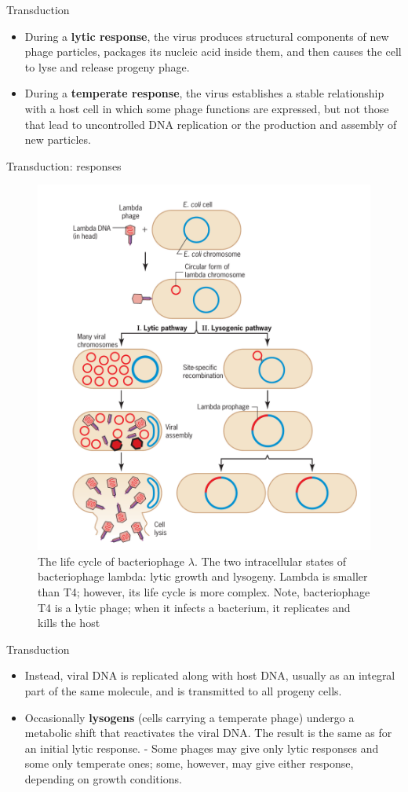 \documentclass[ignorenonframetext,aspectratio=169]{beamer}
\providecommand{\tightlist}{%
  \setlength{\itemsep}{0pt}\setlength{\parskip}{0pt}}
\begin{document}
\begin{frame}{Transduction}
\protect\hypertarget{transduction-1}{}

\begin{itemize}
\tightlist
\item
  During a \textbf{lytic response}, the virus produces structural
  components of new phage particles, packages its nucleic acid inside
  them, and then causes the cell to lyse and release progeny phage.
\item
  During a \textbf{temperate response}, the virus establishes a stable
  relationship with a host cell in which some phage functions are
  expressed, but not those that lead to uncontrolled DNA replication or
  the production and assembly of new particles.
\end{itemize}

\end{frame}

\begin{frame}{Transduction: responses}
\protect\hypertarget{transduction-responses}{}

\begin{figure}
\includegraphics[width=0.25\linewidth]{./../images/bacteriophage_stages} \caption{The life cycle of bacteriophage $\lambda$. The two intracellular states of bacteriophage lambda: lytic growth and lysogeny. Lambda is smaller than T4; however, its life cycle is more complex. Note, bacteriophage T4 is a lytic phage; when it infects a bacterium, it replicates and kills the host}\label{fig:transduction-bacteriophage}
\end{figure}

\end{frame}

\begin{frame}{Transduction}
\protect\hypertarget{transduction-2}{}

\begin{itemize}
\tightlist
\item
  Instead, viral DNA is replicated along with host DNA, usually as an
  integral part of the same molecule, and is transmitted to all progeny
  cells.
\item
  Occasionally \textbf{lysogens} (cells carrying a temperate phage)
  undergo a metabolic shift that reactivates the viral DNA. The result
  is the same as for an initial lytic response. - Some phages may give
  only lytic responses and some only temperate ones; some, however, may
  give either response, depending on growth conditions.
\end{itemize}

\end{frame}
\end{document}
